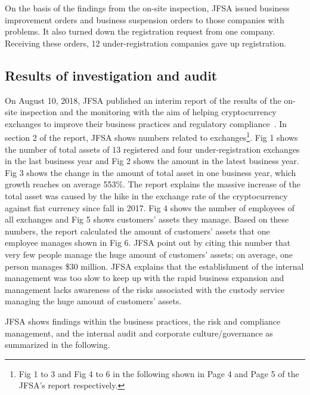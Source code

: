 On the basis of the findings from the on-site inspection, JFSA issued business improvement orders and business suspension orders to those companies with problems. It also turned down the registration request from one company. Receiving these orders, 12 under-registration companies gave up registration.

\subsection{Results of investigation and audit}
On August 10, 2018, JFSA published an interim report of the results of the on-site inspection and the monitoring with the aim of helping cryptocurrency exchanges to improve their business practices and regulatory compliance~\cite{FSAREPORT}. In section 2 of the report, JFSA shows numbers related to exchanges\footnote{Fig 1 to 3 and Fig 4 to 6 in the following shown in Page 4 and Page 5 of the JFSA's report respectively.}. Fig 1 shows the number of total assets of 13 registered and four under-registration exchanges in the last business year and Fig 2 shows the amount in the latest business year.
Fig 3 shows the change in the amount of total asset in one business year, which growth reaches on average 553\%. The report explains the massive increase of the total asset was caused by the hike in the exchange rate of the cryptocurrency against fiat currency since fall in 2017. Fig 4 shows the number of employees of all exchanges and Fig 5 shows customers' assets they manage. Based on these numbers, the report calculated the amount of customers' assets that one employee manages shown in Fig 6. JFSA point out by citing this number that very few people manage the huge amount of customers' assets; on average, one person manages \$30 million. %
JFSA explains that the establishment of the internal management was too slow to keep up with the rapid business expansion and management lacks awareness of the risks associated with the custody service managing the huge amount of customers' assets.

JFSA shows findings within the business practices, the risk and compliance management, and the internal audit and corporate culture/governance as summarized in the following.

